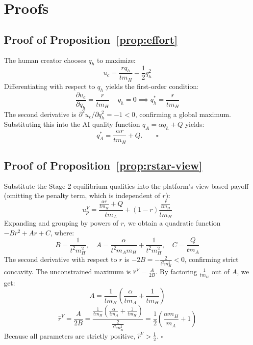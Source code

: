 \documentclass[mnsc,nonblindrev]{informs3_NoOR}
\begin{document}
 




\appendix
\section{Proofs}\label{app:proofs}

\subsection*{Proof of Proposition~\ref{prop:effort}}
The human creator chooses $q_h$ to maximize:
\[
u_c = \frac{rq_h}{t m_H} - \frac{1}{2}q_h^2
\]
Differentiating with respect to $q_h$ yields the first-order condition:
\[
\frac{\partial u_c}{\partial q_h} = \frac{r}{t m_H} - q_h = 0 \implies q_h^* = \frac{r}{t m_H}
\]
The second derivative is $\partial^2 u_c/\partial q_h^2 = -1 < 0$, confirming a global maximum. Substituting this into the AI quality function $q_A = \alpha q_h + Q$ yields:
\[
q_A^* = \frac{\alpha r}{t m_H} + Q. \qquad \square
\]

\subsection*{Proof of Proposition~\ref{prop:rstar-view}}
Substitute the Stage-2 equilibrium qualities into the platform's view-based payoff (omitting the penalty term, which is independent of $r$):
\[
u_p^V = \frac{\frac{\alpha r}{t m_H} + Q }{t m_A} + (1-r)\frac{\frac{r}{t m_H} }{t m_H}
\]
Expanding and grouping by powers of $r$, we obtain a quadratic function $-Br^2 + Ar + C$, where:
\begin{equation}\label{eq:ABC}
B = \frac{1}{t^2 m_H^2}, \quad A = \frac{\alpha}{t^2 m_A m_H} + \frac{1}{t^2 m_H^2} , \quad C = \frac{Q }{t m_A}
\end{equation}
The second derivative with respect to $r$ is $-2B = -\frac{2}{t^2 m_H^2} < 0$, confirming strict concavity. The unconstrained maximum is $\hat{r}^V = \frac{A}{2B}$. By factoring $\frac{1}{t m_H}$ out of $A$, we get:
\[
A = \frac{1}{t m_H}\left(\frac{\alpha}{t m_A} + \frac{1}{t m_H} \right)
\]
\[
\hat{r}^V = \frac{A}{2B} = \frac{\frac{1}{t m_H}\left(\frac{\alpha}{t m_A} + \frac{1}{t m_H} \right)}{\frac{2}{t^2 m_H^2}} = \frac{1}{2}\left(\frac{\alpha m_H}{m_A} + 1 \right)
\]
Because all parameters are strictly positive, $\hat{r}^V > \frac{1}{2}$. \hfill$\square$
\end{document}
